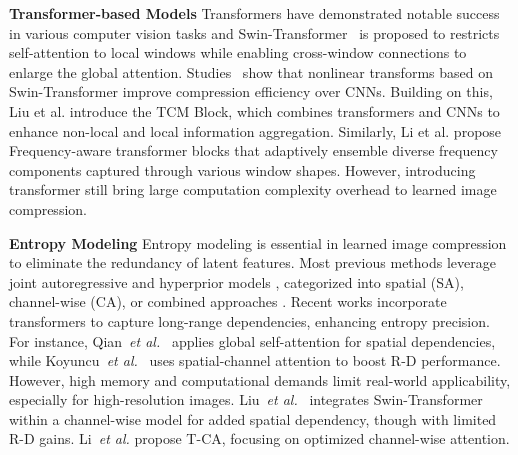 \noindent\textbf{Transformer-based Models} Transformers have demonstrated notable success in various computer vision tasks and Swin-Transformer~\cite{Liu.2021.SwinT} is proposed to restricts self-attention to local windows while enabling cross-window connections to enlarge the global attention. Studies~\cite{Zhu.2021.TBTC, Lu.2022.TIC, Zou.2022.DDW} show that nonlinear transforms based on Swin-Transformer improve compression efficiency over CNNs. Building on this, Liu et al.\cite{Liu.2023.TCM} introduce the TCM Block, which combines transformers and CNNs to enhance non-local and local information aggregation. Similarly, Li et al.\cite{Li.2023.FAT} propose Frequency-aware transformer blocks that adaptively ensemble diverse frequency components captured through various window shapes. However, introducing transformer still bring large computation complexity overhead to learned image compression.




\noindent\textbf{Entropy Modeling} 
Entropy modeling is essential in learned image compression to eliminate the redundancy of latent features. Most previous methods leverage joint autoregressive and hyperprior models \cite{Minnen.2018.Joint}, categorized into spatial \cite{Minnen.2018.Joint} (SA), channel-wise \cite{Minnen.2020.Charm} (CA), or combined approaches \cite{He.2022.ELIC}. Recent works incorporate transformers to capture long-range dependencies, enhancing entropy precision. For instance, Qian~\emph{et al.}~\cite{Qian.2022.EntroFormer} applies global self-attention for spatial dependencies, while Koyuncu~\emph{et al.}~\cite{Koyuncu.2022.CtxFormer} uses spatial-channel attention to boost R-D performance. However, high memory and computational demands limit real-world applicability, especially for high-resolution images. Liu~\emph{et al.}~\cite{Liu.2023.TCM} integrates Swin-Transformer within a channel-wise model for added spatial dependency, though with limited R-D gains. Li~\emph{et al.}\cite{Li.2023.FAT} propose T-CA, focusing on optimized channel-wise attention.


